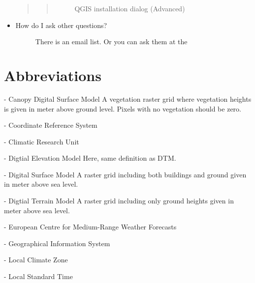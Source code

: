 \documentclass[letterpaper,10pt,english]{sphinxmanual}
\begin{document}
\begin{itemize}
\begin{quote}
\begin{quote}
\begin{figure}[htbp]
\noindent{}
\caption{QGIS installation dialog (Advanced)}\label{\detokenize{FAQ:id1}}\end{figure}
\end{quote}
\end{quote}

\item {} \begin{description}
\item[{How do I ask other questions?}] \leavevmode
There is an email list. Or you can ask them at the 

\end{description}

\end{itemize}


\chapter{Abbreviations}
\label{\detokenize{Abbreviations:abbreviations}}\label{\detokenize{Abbreviations:id1}}\label{\detokenize{Abbreviations::doc}}\begin{description}
\end{description}

 - Canopy Digital Surface Model
A vegetation raster grid where vegetation heights is given in meter above ground level. Pixels with no vegetation should be zero.

  - Coordinate Reference System

  - Climatic Research Unit

  - Digtial Elevation Model
Here, same definition as DTM.

  - Digital Surface Model
A raster grid including both buildings and ground given in meter above sea level.

  - Digtial Terrain Model
A raster grid including only ground heights given in meter above sea level.

 - European Centre for Medium-Range Weather Forecasts

 - Geographical Information System

 - Local Climate Zone

 - Local Standard Time
\end{document}
